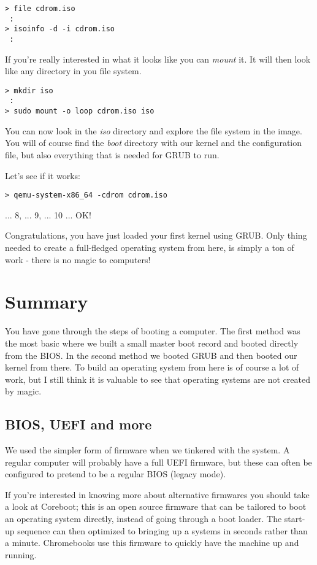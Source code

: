 \documentclass[a4paper,11pt]{article}
\begin{document}
\begin{verbatim}
> file cdrom.iso
 :
> isoinfo -d -i cdrom.iso
 :
\end{verbatim}

If you're really interested in what it looks like you can {\em mount}
it. It will then look like any directory in you file system. 

\begin{verbatim}
> mkdir iso 
 :
> sudo mount -o loop cdrom.iso iso
\end{verbatim}

You can now look in the {\em iso} directory and explore the file
system in the image. You will of course find the {\em boot} directory
with our kernel and the configuration file, but also everything that is
needed for GRUB to run.

Let's see if it works:

\begin{verbatim}
> qemu-system-x86_64 -cdrom cdrom.iso
\end{verbatim}

... 8, ... 9, ... 10 ... OK!

Congratulations, you have just loaded your first kernel using
GRUB. Only thing needed to create a full-fledged operating system from here, is simply a ton of work
- there is no magic to computers!

\section{Summary}

You have gone through the steps of booting a computer. The first
method was the most basic where we built a small master boot record
and booted directly from the BIOS. In the second method we booted GRUB
and then booted our kernel from there. To build an operating system
from here is of course a lot of work, but I still think it is valuable
to see that operating systems are not created by magic.

\subsection*{BIOS, UEFI and more}

We used the simpler form of firmware when we tinkered with the system. A
regular computer will probably have a full UEFI firmware, but these
can often be configured to pretend to be a regular BIOS (legacy mode).

If you're interested in knowing more about alternative firmwares you
should take a look at Coreboot; this is an open source firmware that
can be tailored to boot an operating system directly, instead of going
through a boot loader. The start-up sequence can then optimized to
bringing up a systems in seconds rather than a minute. Chromebooks use
this firmware to quickly have the machine up and running.
\end{document}
